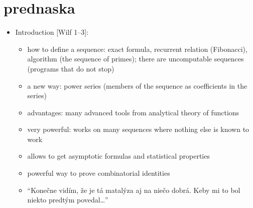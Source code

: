 \documentclass[10pt, a4paper]{article}
\begin{document}

\addtolength{\parskip}{0.5\baselineskip}



\section{prednaska}
\begin{itemize}
\item 
Introduction [Wilf 1--3]:
\begin{itemize}
    \item how to define a sequence: exact formula, recurrent relation (Fibonacci), algorithm (the sequence of primes); there are uncomputable sequences (programs that do not stop)
    \item a new way: power series (members of the sequence as coefficients in the series)
    \item advantages: many advanced tools from analytical theory of functions
    \item very powerful: works on many sequences where nothing else is known to work
    \item allows to get asymptotic formulas and statistical properties
    \item powerful way to prove combinatorial identities
    \item ``Konečne vidím, že je tá matalýza aj na niečo dobrá. Keby mi to bol niekto predtým povedal\dots''
\end{itemize}


\end{itemize}
\end{document}
